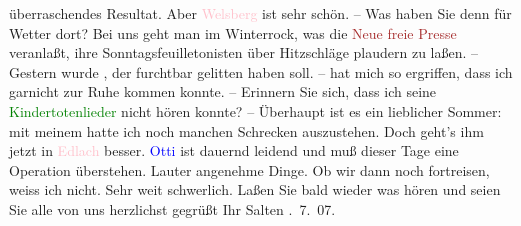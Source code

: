                überraschendes Resultat. Aber \textcolor{pink}{Welsberg}{}\ledrightnote{\textcolor{pink}{Welsberg-Taisten}} ist sehr
               schön. – Was haben Sie denn für Wetter dort? Bei uns geht man im Winterrock, was die
                  \textcolor{brown}{Neue freie Presse}{}\ledrightnote{\textcolor{brown}{Neue Freie Presse}} veranlaßt, ihre
               Sonntagsfeuilletonisten über Hitzschläge plaudern zu laßen. – Gestern wurde \label{K_L03488-2v}\label{K_L03488-2h}, der furchtbar gelitten
               haben soll. \label{K_L03488-3v}\label{K_L03488-3h} – hat mich so
               ergriffen, dass ich garnicht zur Ruhe kommen konnte. – Erinnern Sie sich, dass ich
               seine \textcolor{green}{Kindertotenlieder}{}\ledrightnote{\textcolor{green}{Kindertotenlieder}} nicht hören konnte? –
               Überhaupt ist es ein lieblicher Sommer: mit meinem \label{K_L03488-4v}\label{K_L03488-4h} hatte ich noch manchen Schrecken auszustehen. Doch geht’s ihm jetzt in \textcolor{pink}{Edlach}{}\ledrightnote{\textcolor{pink}{Edlach}} besser. \textcolor{blue}{Otti}{}\ledrightnote{\textcolor{blue}{Ottilie Salten}} ist dauernd leidend und muß dieser Tage eine Operation überstehen.
               Lauter angenehme Dinge. Ob wir dann noch fortreisen, weiss ich nicht. Sehr weit
               schwerlich. Laßen Sie bald wieder was hören und seien Sie alle von uns herzlichst
               gegrüßt\pend
           \pstart Ihr \spacefill\mbox{Salten}\pend{}
. 7. 07.\pend
           \endnumbering{}  
      